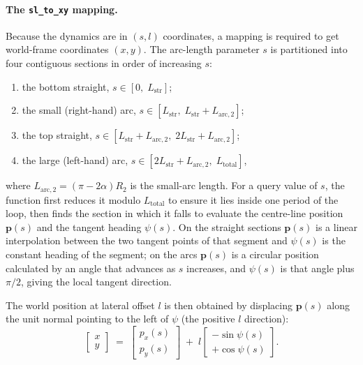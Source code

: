 \paragraph{The \texttt{sl\_to\_xy} mapping.}
Because the dynamics are in $(s,l)$ coordinates, a mapping is required to get world-frame coordinates $(x,y)$. The arc-length parameter $s$ is partitioned into four contiguous sections in order of increasing $s$:
\begin{enumerate}
    \item the bottom straight, $s\in[0,\;L_{\text{str}}]$;
    \item the small (right-hand) arc, $s\in[L_{\text{str}},\;L_{\text{str}} + L_{\text{arc},2}]$;
    \item the top straight, $s\in[L_{\text{str}} + L_{\text{arc},2},\;2L_{\text{str}} + L_{\text{arc},2}]$;
    \item the large (left-hand) arc, $s\in[2L_{\text{str}} + L_{\text{arc},2},\;L_{\text{total}}]$,
\end{enumerate}
where $L_{\text{arc},2}=(\pi-2\alpha)R_2$ is the small-arc length. 
For a query value of $s$, the function first reduces it modulo $L_{\text{total}}$ to ensure it lies inside one period of the loop, then finds the section in which it falls to evaluate the centre-line position $\mathbf{p}(s)$ and the tangent heading $\psi(s)$. On the straight sections $\mathbf{p}(s)$ is a linear interpolation between the two tangent points of that segment and $\psi(s)$ is the constant heading of the segment; on the arcs $\mathbf{p}(s)$ is a circular position calculated by an angle that advances as $s$ increases, and $\psi(s)$ is that angle plus $\pi/2$, giving the local tangent direction.

The world position at lateral offset $l$ is then obtained by displacing $\mathbf{p}(s)$ along the unit normal pointing to the left of $\psi$ (the positive $l$ direction):
\begin{equation}
    \begin{bmatrix} x \\ y \end{bmatrix}
    \;=\;
    \begin{bmatrix} p_x(s) \\ p_y(s) \end{bmatrix}
    \;+\; l
    \begin{bmatrix} -\sin\psi(s) \\ +\cos\psi(s) \end{bmatrix}.
    \label{eq:sl_to_xy}
\end{equation}

